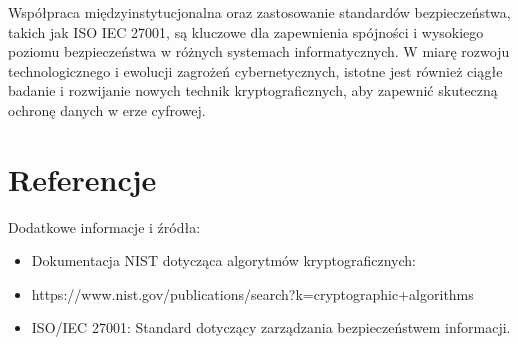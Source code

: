 \documentclass[10pt,a4paper]{article}
\begin{document}
Współpraca międzyinstytucjonalna oraz zastosowanie standardów bezpieczeństwa, takich jak ISO IEC 27001, są kluczowe dla zapewnienia spójności i wysokiego poziomu bezpieczeństwa w różnych systemach informatycznych. W miarę rozwoju technologicznego i ewolucji zagrożeń cybernetycznych, istotne jest również ciągłe badanie i rozwijanie nowych technik kryptograficznych, aby zapewnić skuteczną ochronę danych w erze cyfrowej.

\section{Referencje}
Dodatkowe informacje i źródła:
\begin{itemize}
\item Dokumentacja NIST dotycząca algorytmów kryptograficznych:
\item https://www.nist.gov/publications/search?k=cryptographic+algorithms
\item ISO/IEC 27001: Standard dotyczący zarządzania bezpieczeństwem informacji.
\end{itemize}
\end{document}
